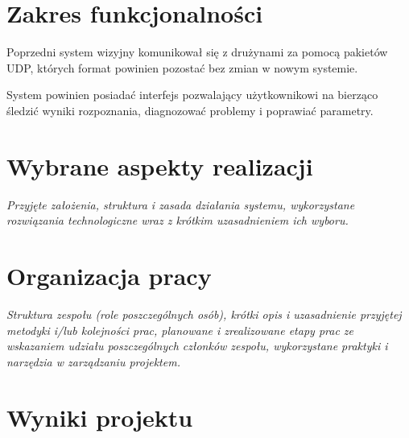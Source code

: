 \documentclass[polish,12pt]{aghthesis}
\begin{document}
\section{Zakres funkcjonalności}
\label{sec:zakres-funkcjonalnosci}
% 
Poprzedni system wizyjny komunikował się z drużynami za
pomocą pakietów UDP, których format powinien pozostać bez zmian w nowym systemie. 

System powinien posiadać interfejs pozwalający użytkownikowi na bierząco śledzić wyniki
rozpoznania, diagnozować problemy i poprawiać parametry.




\section{Wybrane aspekty realizacji}
\label{sec:wybrane-aspekty-realizacji}

\cite{opencv}
\cite{colortag}
\cite{exemplary}
\cite{largeleague}
\cite{mshift}

\emph{Przyjęte założenia, struktura i zasada działania systemu,
  wykorzystane rozwiązania technologiczne wraz z krótkim uzasadnieniem
  ich wyboru.}

\section{Organizacja pracy}
\label{sec:organizacja-pracy}

\emph{Struktura zespołu (role poszczególnych osób), krótki opis i
  uzasadnienie przyjętej metodyki i/lub kolejności prac, planowane i
  zrealizowane etapy prac ze wskazaniem udziału poszczególnych
  członków zespołu, wykorzystane praktyki i narzędzia w zarządzaniu
  projektem.}

\section{Wyniki projektu}
\end{document}
